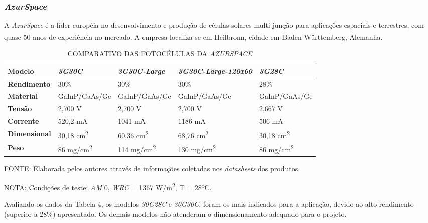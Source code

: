 \documentclass[
	12pt,				%
	openright,			%
	oneside,			%
	a4paper,			%
	english,			%
	french,				%
	spanish,			%
	brazil,				%
	oldfontcommands
	]{abntex2}
\begin{document}
\subsubsection[AzurSpace]{\textit{AzurSpace}}

	A \textit{AzurSpace} é a líder européia no desenvolvimento e produção de células solares multi-junção para aplicações espaciais e terrestres, com quase 50 anos de experiência no mercado. A empresa localiza-se em Heilbronn, cidade em Baden-Württemberg, Alemanha.\textsuperscript{\cite{AzurSpace}}
	
	\begin{table}[th]
	\caption{COMPARATIVO DAS FOTOCÉLULAS DA \textit{AZURSPACE}}
	\begin{tabular}{p{2.5cm}|p{3.1cm}|p{3.1cm}|p{3.1cm}|p{3.1cm}}
		\textbf{Modelo} & \textit{\textbf{3G30C}} & \textit{\textbf{3G30C-Large}} & \textit{\textbf{3G30C-Large-120x60}} & \textit{\textbf{3G28C}} \\
		\hline
		\textbf{Rendimento} & 30\% & 30\% & 30\% & 28\% \\
		\hline
		\textbf{Material} & GaInP/GaAs/Ge & GaInP/GaAs/Ge & GaInP/GaAs/Ge & GaInP/GaAs/Ge\\
		\hline
		\textbf{Tensão} & 2,700 V & 2,700 V & 2,700 V & 2,667 V\\
		\hline
		\textbf{Corrente} & 520,2 mA & 1041 mA & 1186 mA & 506 mA\\
		\hline
		\textbf{Dimensional} & 30,18 cm\textsuperscript{2} & 60,36 cm\textsuperscript{2} & 68,76 cm\textsuperscript{2} & 30,18 cm\textsuperscript{2}\\
		\hline
		\textbf{Peso} & 86 mg/cm\textsuperscript{2} & 114 mg/cm\textsuperscript{2} & 130 mg/cm\textsuperscript{2} & 86 mg/cm\textsuperscript{2}\\
	\end{tabular}
	
	\begin{small}
	\vspace{3pt}
		FONTE: Elaborada pelos autores através de informações coletadas nos \textit{datasheets} dos produtos.
	\end{small}
	\begin{footnotesize}
		NOTA: Condições de teste: \textit{AM} 0, \textit{WRC} = 1367 W/m\textsuperscript{2}, T = 28ºC.
	\end{footnotesize}
	\end{table}	
	
	Avaliando os dados da Tabela 4, os modelos \textit{30G28C} e \textit{30G30C}, foram os mais indicados para a aplicação, devido ao alto rendimento (superior a 28\%) apresentado. Os demais modelos não atenderam o dimensionamento adequado para o projeto.
	
\end{document}

